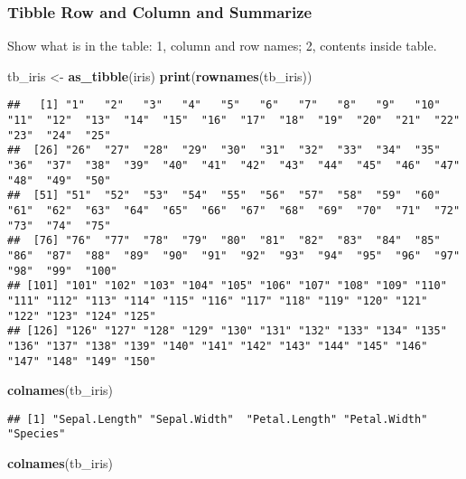 \documentclass[
]{book}
\newenvironment{Shaded}{\begin{snugshade}}{\end{snugshade}}
\newcommand{\KeywordTok}[1]{\textcolor[rgb]{0.13,0.29,0.53}{\textbf{#1}}}
\newcommand{\NormalTok}[1]{#1}
\newcommand{\StringTok}[1]{\textcolor[rgb]{0.31,0.60,0.02}{#1}}
\begin{document}
\hypertarget{tibble-row-and-column-and-summarize}{%
\subsubsection{Tibble Row and Column and Summarize}\label{tibble-row-and-column-and-summarize}}

Show what is in the table: 1, column and row names; 2, contents inside table.

\begin{Shaded}
\begin{Highlighting}[]
\NormalTok{tb_iris <-}\StringTok{ }\KeywordTok{as_tibble}\NormalTok{(iris)}
\KeywordTok{print}\NormalTok{(}\KeywordTok{rownames}\NormalTok{(tb_iris))}
\end{Highlighting}
\end{Shaded}

\begin{verbatim}
##   [1] "1"   "2"   "3"   "4"   "5"   "6"   "7"   "8"   "9"   "10"  "11"  "12"  "13"  "14"  "15"  "16"  "17"  "18"  "19"  "20"  "21"  "22"  "23"  "24"  "25" 
##  [26] "26"  "27"  "28"  "29"  "30"  "31"  "32"  "33"  "34"  "35"  "36"  "37"  "38"  "39"  "40"  "41"  "42"  "43"  "44"  "45"  "46"  "47"  "48"  "49"  "50" 
##  [51] "51"  "52"  "53"  "54"  "55"  "56"  "57"  "58"  "59"  "60"  "61"  "62"  "63"  "64"  "65"  "66"  "67"  "68"  "69"  "70"  "71"  "72"  "73"  "74"  "75" 
##  [76] "76"  "77"  "78"  "79"  "80"  "81"  "82"  "83"  "84"  "85"  "86"  "87"  "88"  "89"  "90"  "91"  "92"  "93"  "94"  "95"  "96"  "97"  "98"  "99"  "100"
## [101] "101" "102" "103" "104" "105" "106" "107" "108" "109" "110" "111" "112" "113" "114" "115" "116" "117" "118" "119" "120" "121" "122" "123" "124" "125"
## [126] "126" "127" "128" "129" "130" "131" "132" "133" "134" "135" "136" "137" "138" "139" "140" "141" "142" "143" "144" "145" "146" "147" "148" "149" "150"
\end{verbatim}

\begin{Shaded}
\begin{Highlighting}[]
\KeywordTok{colnames}\NormalTok{(tb_iris)}
\end{Highlighting}
\end{Shaded}

\begin{verbatim}
## [1] "Sepal.Length" "Sepal.Width"  "Petal.Length" "Petal.Width"  "Species"
\end{verbatim}

\begin{Shaded}
\begin{Highlighting}[]
\KeywordTok{colnames}\NormalTok{(tb_iris)}
\end{Highlighting}
\end{Shaded}
\end{document}
